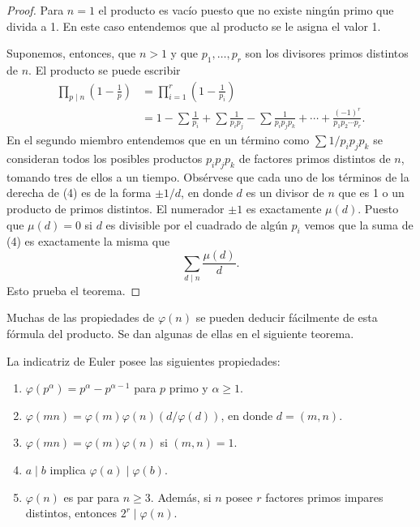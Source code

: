 \documentclass[12pt,a4paper]{book}
\begin{document}
    \begin{proof}
        Para $n=1$ el producto es vacío puesto que no existe ningún primo que divida a 1.
        En este caso entendemos que al producto se le asigna el valor 1.

        Suponemos, entonces, que $n>1$ y que $p_1,\dots,p_r$ son los divisores primos
        distintos de $n$. El producto se puede escribir
        \begin{align}
            \prod_{p\mid n}\left(1-\frac{1}{p}\right)&=\prod_{i=1}^{r}\left(1-\frac{1}{p_i}\right)\\
            &=1-\sum\frac{1}{p_i}+\sum\frac{1}{p_ip_j}-\sum\frac{1}{p_ip_jp_k}+\cdots
            +\frac{(-1)^r}{p_1p_2\cdots p_r}.
        \end{align}
        En el segundo miembro entendemos que en un término como $\sum1/p_ip_jp_k$ se
        consideran todos los posibles productos $p_ip_jp_k$ de factores primos distintos de
        $n$, tomando tres de ellos a un tiempo. Obsérvese que cada uno de los términos de la
        derecha de (4) es de la forma $\pm1/d$, en donde $d$ es un divisor de $n$ que es 1 o
        un producto de primos distintos. El numerador $\pm1$ es exactamente $\mu(d)$. Puesto
        que $\mu(d)=0$ si $d$ es divisible por el cuadrado de algún $p_i$ vemos que la suma
        de (4) es exactamente la misma que
        \begin{equation*}
            \sum_{d\mid n}\frac{\mu(d)}{d}.
        \end{equation*}
        Esto prueba el teorema.
    \end{proof}

    Muchas de las propiedades de $\varphi(n)$ se pueden deducir fácilmente de esta fórmula
    del producto. Se dan algunas de ellas en el siguiente teorema.

    \begin{teorema}
        La indicatriz de Euler posee las siguientes propiedades:
        \begin{enumerate}
            \item[(a)] $\varphi(p^\alpha)=p^\alpha-p^{\alpha-1}$ para $p$ primo y
            $\alpha\geq1$.
            \item[(b)] $\varphi(mn)=\varphi(m)\varphi(n)(d/\varphi(d))$, en donde $d=(m,n)$.
            \item[(c)] $\varphi(mn)=\varphi(m)\varphi(n)$ si $(m,n)=1$.
            \item[(d)] $a\mid b$ implica $\varphi(a)\mid\varphi(b)$.
            \item[(e)] $\varphi(n)$ es par para $n\geq3$. Además, si $n$ posee $r$ factores
            primos impares distintos, entonces $2^r\mid\varphi(n)$.
        \end{enumerate}
    \end{teorema}
\end{document}
